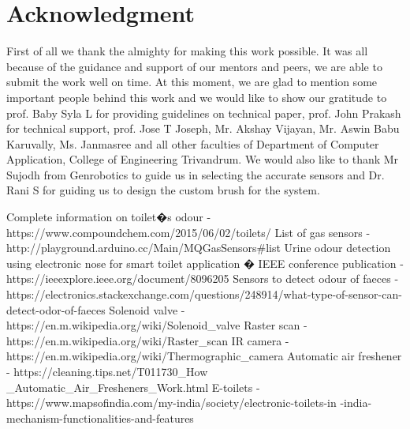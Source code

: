 \documentclass[conference]{IEEEtran}
\begin{document}
\section*{Acknowledgment}
    First of all we thank the almighty for making this work possible. It was all because of the guidance and support of our mentors and peers, we are able to submit the work well on time. At this moment, we are glad to mention some important people behind this work and we would like to show our gratitude to prof. Baby Syla L for providing guidelines on technical paper, prof. John Prakash for technical support, prof. Jose T Joseph, Mr. Akshay Vijayan, Mr. Aswin Babu Karuvally, Ms. Janmasree and all other faculties of Department of Computer Application, College of Engineering Trivandrum. We would also like to thank Mr Sujodh from Genrobotics to guide us in selecting the accurate sensors and Dr. Rani S for guiding us to design the custom brush for the system.
    
\begin{thebibliography}{00}
     Complete information on toilet�s odour -\\ https://www.compoundchem.com/2015/06/02/toilets/
     List of gas sensors -\\ http://playground.arduino.cc/Main/MQGasSensors\#list
     Urine odour detection using electronic nose for smart toilet application � IEEE conference publication - \\ https://ieeexplore.ieee.org/document/8096205
     Sensors to detect odour of faeces - \\ https://electronics.stackexchange.com/questions/248914/what-type-of-sensor-can-detect-odor-of-faeces
     Solenoid valve - https://en.m.wikipedia.org/wiki/Solenoid\_valve
     Raster scan -  https://en.m.wikipedia.org/wiki/Raster\_scan
     IR camera - https://en.m.wikipedia.org/wiki/Thermographic\_camera
     Automatic air freshener  -  https://cleaning.tips.net/T011730\_How\\\_Automatic\_Air\_Fresheners\_Work.html
     E-toilets - https://www.mapsofindia.com/my-india/society/electronic-toilets-in    -india-mechanism-functionalities-and-features
\end{thebibliography}
\end{document}
